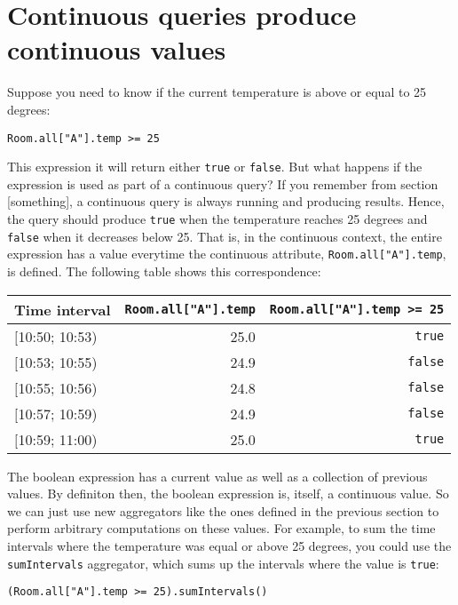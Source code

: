 \documentclass{report}
\begin{document}
\section{Continuous queries produce continuous values}

Suppose you need to know if the current temperature is above or equal
to 25 degrees:

\begin{verbatim}
Room.all["A"].temp >= 25
\end{verbatim}

This expression it will return either \verb=true= or \verb=false=. But
what happens if the expression is used as part of a continuous query?
If you remember from section [something], a continuous query is always
running and producing results. Hence, the query should produce
\verb=true= when the temperature reaches 25 degrees and \verb=false=
when it decreases below 25. That is, in the continuous context, the
entire expression has a value everytime the continuous attribute,
\verb=Room.all["A"].temp=, is defined. The following table shows this
correspondence:

\begin{tabular}{ |l|r|r| }
  \hline
  Time interval & \verb=Room.all["A"].temp= & \verb!Room.all["A"].temp >= 25! \\
  \hline
  $[$10:50; 10:53) & 25.0 & \verb=true=  \\
  $[$10:53; 10:55) & 24.9 & \verb=false= \\
  $[$10:55; 10:56) & 24.8 & \verb=false= \\
  $[$10:57; 10:59) & 24.9 & \verb=false= \\
  $[$10:59; 11:00) & 25.0 & \verb=true=  \\
  \hline
\end{tabular}

The boolean expression has a current value as well as a collection of
previous values. By definiton then, the boolean expression is, itself,
a continuous value. So we can just use new aggregators like the ones
defined in the previous section to perform arbitrary computations on
these values. For example, to sum the time intervals where the
temperature was equal or above 25 degrees, you could use the
\verb=sumIntervals= aggregator, which sums up the intervals where the
value is \verb=true=:

\begin{verbatim}
(Room.all["A"].temp >= 25).sumIntervals()
\end{verbatim}
\end{document}
